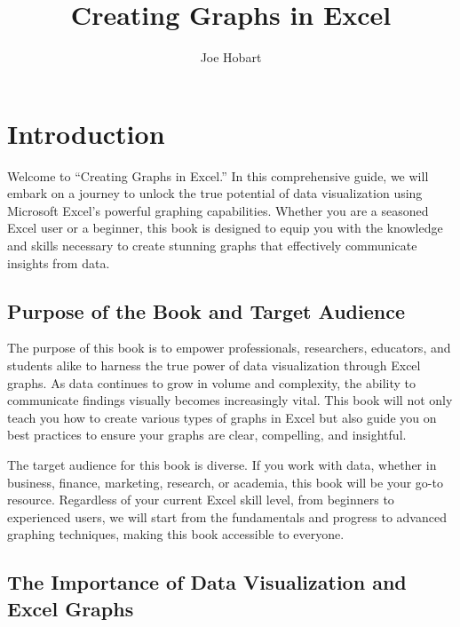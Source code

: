 \documentclass[
]{book}
\title{Creating Graphs in Excel}
\author{Joe Hobart}
\date{}
\begin{document}
\maketitle

{
\setcounter{tocdepth}{1}
\tableofcontents
}
\hypertarget{introduction}{%
\chapter{Introduction}\label{introduction}}

Welcome to ``Creating Graphs in Excel.'' In this comprehensive guide, we will embark on a journey to unlock the true potential of data visualization using Microsoft Excel's powerful graphing capabilities. Whether you are a seasoned Excel user or a beginner, this book is designed to equip you with the knowledge and skills necessary to create stunning graphs that effectively communicate insights from data.

\hypertarget{purpose-of-the-book-and-target-audience}{%
\section{Purpose of the Book and Target Audience}\label{purpose-of-the-book-and-target-audience}}

The purpose of this book is to empower professionals, researchers, educators, and students alike to harness the true power of data visualization through Excel graphs. As data continues to grow in volume and complexity, the ability to communicate findings visually becomes increasingly vital. This book will not only teach you how to create various types of graphs in Excel but also guide you on best practices to ensure your graphs are clear, compelling, and insightful.

The target audience for this book is diverse. If you work with data, whether in business, finance, marketing, research, or academia, this book will be your go-to resource. Regardless of your current Excel skill level, from beginners to experienced users, we will start from the fundamentals and progress to advanced graphing techniques, making this book accessible to everyone.

\hypertarget{the-importance-of-data-visualization-and-excel-graphs}{%
\section{The Importance of Data Visualization and Excel Graphs}\label{the-importance-of-data-visualization-and-excel-graphs}}
\end{document}
